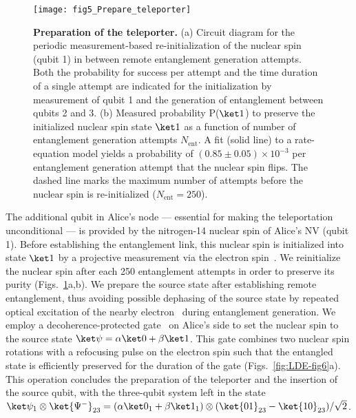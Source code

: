 \begin{figure*}
	\centering
    \texttt{[image: fig5\_Prepare\_teleporter]}
    \caption{
    \label{fig:LDE-fig5} 
    \textbf{Preparation of the teleporter.}
    (a) Circuit diagram for the periodic measurement-based re-initialization of the nuclear spin (qubit 1) in between remote entanglement generation attempts. Both the probability for success per attempt and the time duration of a single attempt are indicated for the initialization by measurement of qubit 1 and the generation of entanglement between qubits 2 and 3. 
    (b) Measured probability P($\ket1$) to preserve the initialized nuclear spin state $\ket1$ as a function of number of entanglement generation attempts $N_\text{ent}$. A fit (solid line) to a rate-equation model yields a probability of $(0.85 \pm 0.05) \times 10^{-3}$ per entanglement generation attempt that the nuclear spin flips. The dashed line marks the maximum number of attempts before the nuclear spin is re-initialized ($N_\text{ent} = 250$). }
\end{figure*}



The additional qubit in Alice's node --- essential for making the teleportation unconditional --- is provided by the nitrogen-14 nuclear spin of Alice's NV (qubit 1). Before establishing the entanglement link, this nuclear spin is initialized into state $\ket1$ by a projective measurement via the electron spin~\cite{Robledo_Nature_2011}. We reinitialize the nuclear spin after each 250 entanglement attempts in order to preserve its purity (Figs.~\ref{fig:LDE-fig5}a,b). We prepare the source state after establishing remote entanglement, thus avoiding possible dephasing of the source state by repeated optical excitation of the nearby electron~\cite{Jiang_Phys.Rev.Lett._2008,Blok_NatPhys_2014} during entanglement generation. We employ a decoherence-protected gate~\cite{vanderSar_Nature_2012} on Alice's side to set the nuclear spin to the source state $\ket\psi = \alpha\ket0 + \beta\ket1$. This gate combines two nuclear spin rotations with a refocusing pulse on the electron spin such that the entangled state is efficiently preserved for the duration of the gate (Figs.~\ref{fig:LDE-fig6}a). This operation concludes the preparation of the teleporter and the insertion of the source qubit, with the three-qubit system left in the state $\ket\psi_1 \otimes \ket{\Psi^-}_{23} = (\alpha\ket0_1 + \beta\ket1_1) \otimes (\ket{01}_{23} - \ket{10}_{23})/\sqrt2$.

